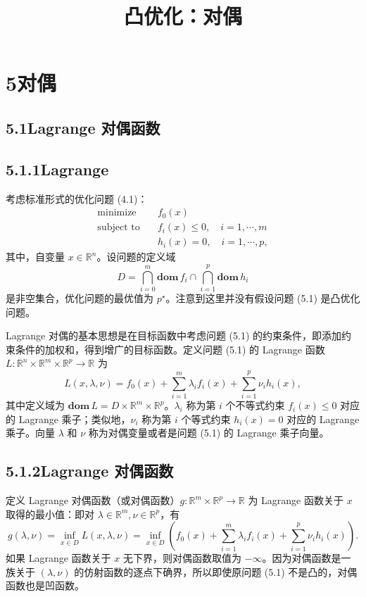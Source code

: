 \documentclass[UTF8, 12pt, fontset=fandol, oneside]{ctexart}
\title{凸优化：对偶}
\author{}
\date{}
\begin{document}
\maketitle

\section*{5\quad 对偶}

\subsection*{5.1\quad Lagrange 对偶函数}

\subsection*{5.1.1\quad Lagrange}

考虑标准形式的优化问题 (4.1)：
\begin{equation}
\begin{aligned}
\text{minimize}\quad & f_0(x)\\
\text{subject to}\quad & f_i(x)\leq 0,\quad i=1,\cdots,m\\
& h_i(x)=0,\quad i=1,\cdots,p,
\end{aligned}
\tag{5.1}
\end{equation}
其中，自变量 $x\in\mathbb{R}^n$。设问题的定义域
\[
D=\bigcap_{i=0}^m \mathbf{dom}\,f_i\cap \bigcap_{i=1}^p \mathbf{dom}\,h_i
\]
是非空集合，优化问题的最优值为 $p^\star$。注意到这里并没有假设问题 (5.1) 是凸优化问题。

Lagrange 对偶的基本思想是在目标函数中考虑问题 (5.1) 的约束条件，即添加约束条件的加权和，得到增广的目标函数。定义问题 (5.1) 的 Lagrange 函数 $L:\mathbb{R}^n\times\mathbb{R}^m\times\mathbb{R}^p\to\mathbb{R}$ 为
\[
L(x,\lambda,\nu)=f_0(x)+\sum_{i=1}^m \lambda_i f_i(x)+\sum_{i=1}^p \nu_i h_i(x),
\]
其中定义域为 $\mathbf{dom}\,L=D\times\mathbb{R}^m\times\mathbb{R}^p$。$\lambda_i$ 称为第 $i$ 个不等式约束 $f_i(x)\leq 0$ 对应的 Lagrange 乘子；类似地，$\nu_i$ 称为第 $i$ 个等式约束 $h_i(x)=0$ 对应的 Lagrange 乘子。向量 $\lambda$ 和 $\nu$ 称为对偶变量或者是问题 (5.1) 的 Lagrange 乘子向量。

\subsection*{5.1.2\quad Lagrange 对偶函数}

定义 Lagrange 对偶函数（或对偶函数）$g:\mathbb{R}^m\times\mathbb{R}^p\to\mathbb{R}$ 为 Lagrange 函数关于 $x$ 取得的最小值：即对 $\lambda\in\mathbb{R}^m,\nu\in\mathbb{R}^p$，有
\[
g(\lambda,\nu)=\inf_{x\in D} L(x,\lambda,\nu)
=\inf_{x\in D}\left(f_0(x)+\sum_{i=1}^m \lambda_i f_i(x)+\sum_{i=1}^p \nu_i h_i(x)\right).
\]
如果 Lagrange 函数关于 $x$ 无下界，则对偶函数取值为 $-\infty$。因为对偶函数是一族关于 $(\lambda,\nu)$ 的仿射函数的逐点下确界，所以即使原问题 (5.1) 不是凸的，对偶函数也是凹函数。
\end{document}
